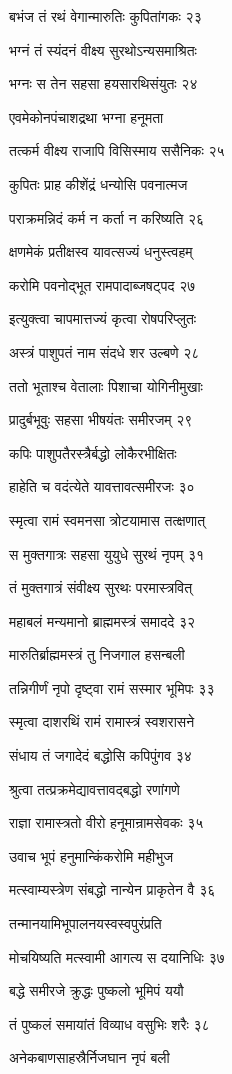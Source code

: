 बभंज तं रथं वेगान्मारुतिः कुपितांगकः २३

भग्नं तं स्यंदनं वीक्ष्य सुरथोऽन्यसमाश्रितः

भग्नः स तेन सहसा हयसारथिसंयुतः २४

एवमेकोनपंचाशद्रथा भग्ना हनूमता

तत्कर्म वीक्ष्य राजापि विसिस्माय ससैनिकः २५

कुपितः प्राह कीशेंद्रं धन्योसि पवनात्मज

पराक्रमन्निदं कर्म न कर्ता न करिष्यति २६

क्षणमेकं प्रतीक्षस्व यावत्सज्यं धनुस्त्वहम्

करोमि पवनोद्भूत रामपादाब्जषट्पद २७

इत्युक्त्वा चापमात्तज्यं कृत्वा रोषपरिप्लुतः

अस्त्रं पाशुपतं नाम संदधे शर उल्बणे २८

ततो भूताश्च वेतालाः पिशाचा योगिनीमुखाः

प्रादुर्बभूवुः सहसा भीषयंतः समीरजम् २९

कपिः पाशुपतैरस्त्रैर्बद्धो लोकैरभीक्षितः

हाहेति च वदंत्येते यावत्तावत्समीरजः ३०

स्मृत्वा रामं स्वमनसा त्रोटयामास तत्क्षणात्

स मुक्तगात्रः सहसा युयुधे सुरथं नृपम् ३१

तं मुक्तगात्रं संवीक्ष्य सुरथः परमास्त्रवित्

महाबलं मन्यमानो ब्राह्ममस्त्रं समाददे ३२

मारुतिर्ब्राह्ममस्त्रं तु निजगाल हसन्बली

तन्निगीर्णं नृपो दृष्ट्वा रामं सस्मार भूमिपः ३३

स्मृत्वा दाशरथिं रामं रामास्त्रं स्वशरासने

संधाय तं जगादेदं बद्धोसि कपिपुंगव ३४

श्रुत्वा तत्प्रक्रमेद्यावत्तावद्बद्धो रणांगणे

राज्ञा रामास्त्रतो वीरो हनूमान्रामसेवकः ३५

उवाच भूपं हनुमान्किंकरोमि महीभुज

मत्स्वाम्यस्त्रेण संबद्धो नान्येन प्राकृतेन वै ३६

तन्मानयामिभूपालनयस्वस्वपुरंप्रति

मोचयिष्यति मत्स्वामी आगत्य स दयानिधिः ३७

बद्धे समीरजे क्रुद्धः पुष्कलो भूमिपं ययौ

तं पुष्कलं समायांतं विव्याध वसुभिः शरैः ३८

अनेकबाणसाहस्रैर्निजघान नृपं बली

